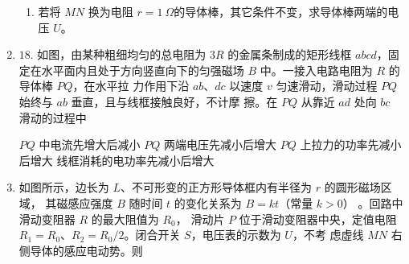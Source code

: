 \begin{enumerate}
\begin{enumerate}
\item 
若将 $ MN $ 换为电阻 $ r=1 \ \Omega $的导体棒，其它条件不变，求导体棒两端的电压 $ U $。

\end{enumerate}
\begin{figure}[h!]
\flushright

\end{figure}



\item 
{}
$ 18 $. 如图，由某种粗细均匀的总电阻为 $ 3R $ 的金属条制成的矩形线框 $ abcd $，固
定在水平面内且处于方向竖直向下的匀强磁场 $ B $ 中。一接入电路电阻为 $ R $ 的导体棒 $ PQ $，在水平拉
力作用下沿 $ ab $、$ dc $ 以速度 $ v $ 匀速滑动，滑动过程 $ PQ $ 始终与 $ ab $ 垂直，且与线框接触良好，不计摩
擦。在 $ PQ $ 从靠近 $ ad $ 处向 $ bc $ 滑动的过程中  
\begin{figure}[h!]
\centering

\end{figure}


\fourchoices
{$ PQ $ 中电流先增大后减小}
{$ PQ $ 两端电压先减小后增大}
{$ PQ $ 上拉力的功率先减小后增大}
{线框消耗的电功率先减小后增大}






\item
{}
如图所示，边长为 $ L $、不可形变的正方形导体框内有半径为 $ r $ 的圆形磁场区域，
其磁感应强度 $ B $ 随时间 $ t $ 的变化关系为 $ B=kt $（常量 $ k > 0 $）
。回路中滑动变阻器 $ R $ 的最大阻值为 $ R_{0} $，
滑动片 $ P $ 位于滑动变阻器中央，定值电阻 $ R_{1} = R_{0} $、$ R_{2} = R_{0} /2 $。闭合开关 $ S $，电压表的示数为 $ U $，不考
虑虚线 $ MN $ 右侧导体的感应电动势。则  
\begin{figure}[h!]
\centering

\end{figure}




\end{enumerate}
